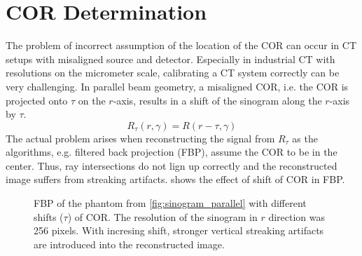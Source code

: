 \documentclass[10pt,journal,compsoc]{IEEEtran}
\begin{document}
\section{COR Determination}\label{sec:cordetermination}
The problem of incorrect assumption of the location of the COR can occur in CT setups with misaligned source and detector.
Especially in industrial CT with resolutions on the micrometer scale, calibrating a CT system correctly can be very challenging.
In parallel beam geometry, a misaligned COR, i.e. the COR is projected onto $\tau$ on the $r$-axis, results in a shift of the sinogram along the $r$-axis by $\tau$.
\begin{equation}
\label{eq:radonoffset}
R_\tau(r,\gamma) = R(r-\tau,\gamma)
\end{equation}
The actual problem arises when reconstructing the signal from $R_\tau$ as the algorithms, e.g. filtered back projection (FBP), assume the COR to be in the center.
Thus, ray intersections do not lign up correctly and the reconstructed image suffers from streaking artifacts.
 shows the effect of shift of COR in FBP.
%
\begin{figure}[!h]
\centering
{}
\hfil
{}
\hfil
{}
\hfil
{}
\caption{
FBP of the phantom from \cref{fig:sinogram_parallel} with different shifts ($\tau$) of COR.
The resolution of the sinogram in $r$ direction was 256 pixels.
With incresing shift, stronger vertical streaking artifacts are introduced into the reconstructed image.
}
\label{fig:shiftfbp}
\end{figure}
%
\end{document}
